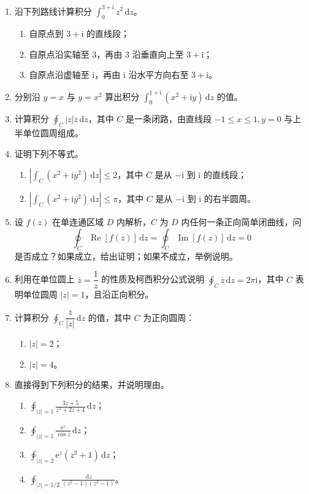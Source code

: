 \documentclass[UTF8,11pt,a4paper]{ctexart}
\newcommand{\dd}{\,\mathrm{d}}
\newcommand{\ee}{\mathrm{e}}
\newcommand{\ii}{\mathrm{i}}
\newcommand{\Ree}{\operatorname{Re}}
\newcommand{\Imm}{\operatorname{Im}}
\begin{document}
\begin{enumerate}
\item 沿下列路线计算积分 $\displaystyle\int_0^{3+\ii}z^2\dd z$。
  \begin{enumerate}
  \item 自原点到 $3+\ii$ 的直线段；
  \item 自原点沿实轴至 $3$，再由 $3$ 沿垂直向上至 $3+\ii$；
  \item 自原点沿虚轴至 $\ii$，再由 $\ii$ 沿水平方向右至 $3+\ii$。
  \end{enumerate}

\item 分别沿 $y=x$ 与 $y=x^2$ 算出积分
$\displaystyle\int_0^{1+\ii}(x^2+\ii y)\dd z$ 的值。

\item 计算积分 $\displaystyle\oint_C|z|\overline z\dd z$，其中 $C$ 是一条闭路，由直线段 $-1\leqslant x\leqslant1,y=0$ 与上半单位圆周组成。

\item 证明下列不等式。
  \begin{enumerate}
  \item $\displaystyle\left|\int_C(x^2+\ii y^2)\dd z\right|\leqslant2$，其中 $C$ 是从 $-\ii$ 到 $\ii$ 的直线段；
  \item $\displaystyle\left|\int_C(x^2+\ii y^2)\dd z\right|\leqslant\pi$，其中 $C$ 是从 $-\ii$ 到 $\ii$ 的右半圆周。
  \end{enumerate}

\item 设 $f(z)$ 在单连通区域 $D$ 内解析，$C$ 为 $D$ 内任何一条正向简单闭曲线，问
\[
\oint_C\Ree[f(z)]\dd z=\oint_C\Imm[f(z)]\dd z=0
\]
是否成立？如果成立，给出证明；如果不成立，举例说明。

\item 利用在单位圆上 $\overline z=\dfrac1z$ 的性质及柯西积分公式说明
$\displaystyle\oint_C\overline z\dd z=2\pi\ii$，其中 $C$ 表明单位圆周 $|z|=1$，且沿正向积分。

\item 计算积分 $\displaystyle\oint_C\dfrac{\overline z}{|z|}\dd z$ 的值，其中 $C$ 为正向圆周：
  \begin{enumerate}
  \item $|z|=2$；
  \item $|z|=4$。
  \end{enumerate}

\item 直接得到下列积分的结果，并说明理由。
  \begin{enumerate}
  \item $\displaystyle\oint_{|z|=1}\frac{3z+5}{z^2+2z+4}\dd z$；
  \item $\displaystyle\oint_{|z|=1}\frac{\ee^z}{\cos z}\dd z$；
  \item $\displaystyle\oint_{|z|=2}\ee^z(z^2+1)\dd z$；
  \item $\displaystyle\oint_{|z|=1/2}\frac{\dd z}{(z^2-1)(z^3-1)}$。
  \end{enumerate}


\end{enumerate}
\end{document}
